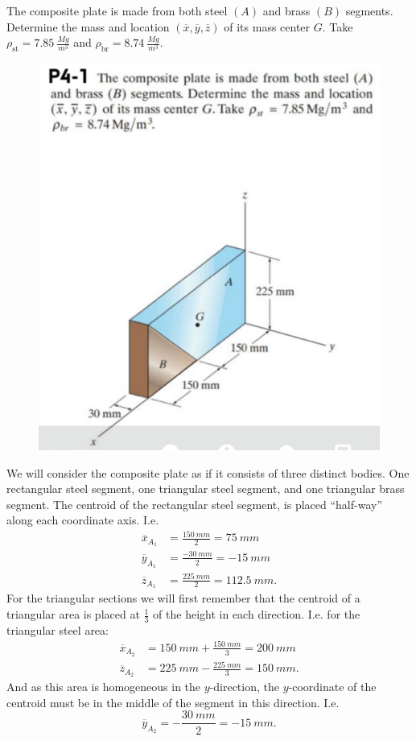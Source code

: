 \documentclass[a4paper]{article}
\begin{document}
The composite plate is made from both steel $(A)$ and brass $(B)$ segments. Determine the mass and location $(\overline{x}, \overline{y}, \overline{z})$ of its mass center $G$. Take $\rho_{\mathrm{st}} = \qty{7,85}{\frac{Mg}{m^3}} $ and $\rho_{\mathrm{br}} = \qty{8,74}{\frac{Mg}{m^3}}$. 
\begin{figure} [ht]
  \centering
  \includegraphics[width=0.5\linewidth]{../figures/p4_1.png}
\end{figure}
\bigbreak
We will consider the composite plate as if it consists of three distinct bodies. One rectangular steel segment, one triangular steel segment, and one triangular brass segment. The centroid of the rectangular steel segment, is placed ``half-way'' along each coordinate axis. I.e.
\begin{align*}
  \overline{x}_{A_1} &= \frac{\qty{150}{mm}}{2} = \qty{75}{mm}  \\
  \overline{y}_{A_1} &= \frac{- \qty{30}{mm} }{2} = - \qty{15}{mm}  \\
  \overline{z}_{A_1} &= \frac{\qty{225}{mm} }{2} = \qty{112,5}{mm} 
.\end{align*}
For the triangular sections we will first remember that the centroid of a triangular area is placed at $\frac{1}{3}$ of the height in each direction. I.e. for the triangular steel area:
\begin{align*}
  \overline{x}_{A_2} &= \qty{150}{mm} + \frac{\qty{150}{mm} }{3} = \qty{200}{mm}  \\
  \overline{z}_{A_2} &= \qty{225}{mm} - \frac{\qty{225}{mm} }{3} = \qty{150}{mm}
.\end{align*}
And as this area is homogeneous in the $y$-direction, the $y$-coordinate of the centroid must be in the middle of the segment in this direction. I.e.
\[ 
\overline{y}_{A_2} = -\frac{\qty{30}{mm} }{2} = -\qty{15}{mm} 
.\]
\end{document}
